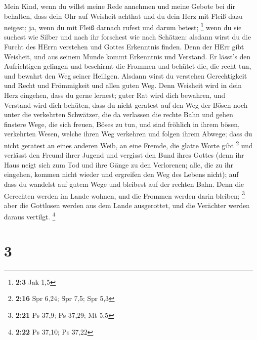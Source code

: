  Mein Kind, wenn du willst meine Rede annehmen und meine
Gebote bei dir behalten,  dass dein Ohr auf Weisheit achthat
und du dein Herz mit Fleiß dazu neigest;  ja, wenn du mit
Fleiß darnach rufest und darum betest; \footnote{\textbf{2:3} Jak 1,5}
 wenn du sie suchest wie Silber und nach ihr forschest wie
nach Schätzen:  alsdann wirst du die Furcht des HErrn
verstehen und Gottes Erkenntnis finden.  Denn der HErr gibt
Weisheit, und aus seinem Munde kommt Erkenntnis und Verstand.
 Er lässt's den Aufrichtigen gelingen und beschirmt die
Frommen  und behütet die, die recht tun, und bewahrt den Weg
seiner Heiligen.  Alsdann wirst du verstehen Gerechtigkeit
und Recht und Frömmigkeit und allen guten Weg.  Denn
Weisheit wird in dein Herz eingehen, dass du gerne lernest;
 guter Rat wird dich bewahren, und Verstand wird dich
behüten,  dass du nicht geratest auf den Weg der Bösen noch
unter die verkehrten Schwätzer,  die da verlassen die
rechte Bahn und gehen finstere Wege,  die sich freuen,
Böses zu tun, und sind fröhlich in ihrem bösen, verkehrten Wesen,
 welche ihren Weg verkehren und folgen ihrem Abwege;
 dass du nicht geratest an eines anderen Weib, an eine
Fremde, die glatte Worte gibt \footnote{\textbf{2:16} Spr 6,24; Spr 7,5;
  Spr 5,3}  und verlässt den Freund ihrer Jugend und
vergisst den Bund ihres Gottes  (denn ihr Haus neigt sich
zum Tod und ihre Gänge zu den Verlorenen;  alle, die zu ihr
eingehen, kommen nicht wieder und ergreifen den Weg des Lebens nicht);
 auf dass du wandelst auf gutem Wege und bleibest auf der
rechten Bahn.  Denn die Gerechten werden im Lande wohnen,
und die Frommen werden darin bleiben; \footnote{\textbf{2:21} Ps 37,9;
  Ps 37,29; Mt 5,5}  aber die Gottlosen werden aus dem
Lande ausgerottet, und die Verächter werden daraus vertilgt. \footnote{\textbf{2:22}
  Ps 37,10; Ps 37,22}

\hypertarget{section-2}{%
\section{3}\label{section-2}}

